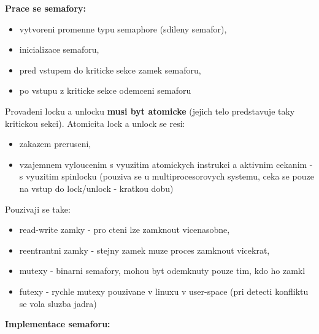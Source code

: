 \documentclass[a4paper, 11pt]{article}
\begin{document}
\textbf{Prace se semafory:}
\begin{itemize}
    \item vytvoreni promenne typu semaphore (sdileny semafor),
    \item inicializace semaforu,
    \item pred vstupem do kriticke sekce zamek semaforu,
    \item po vstupu z kriticke sekce odemceni semaforu \\
\end{itemize}

Provadeni locku a unlocku \textbf{musi byt atomicke} (jejich telo predstavuje taky kritickou sekci). Atomicita lock a unlock se resi:
\begin{itemize}
    \item zakazem preruseni,
    \item vzajemnem vyloucenim s vyuzitim atomickych instrukci a aktivnim cekanim - s vyuzitim spinlocku (pouziva se u multiprocesorovych systemu, ceka se pouze na vstup do lock/unlock - kratkou dobu) \\
\end{itemize}

Pouzivaji se take:
\begin{itemize}
    \item read-write zamky - pro cteni lze zamknout vicenasobne,
    \item reentrantni zamky - stejny zamek muze proces zamknout vicekrat,
    \item mutexy - binarni semafory, mohou byt odemknuty pouze tim, kdo ho zamkl
    \item futexy - rychle mutexy pouzivane v linuxu v user-space (pri detecti konfliktu se vola sluzba jadra) \\
\end{itemize}

\textbf{Implementace semaforu:}
\end{document}

